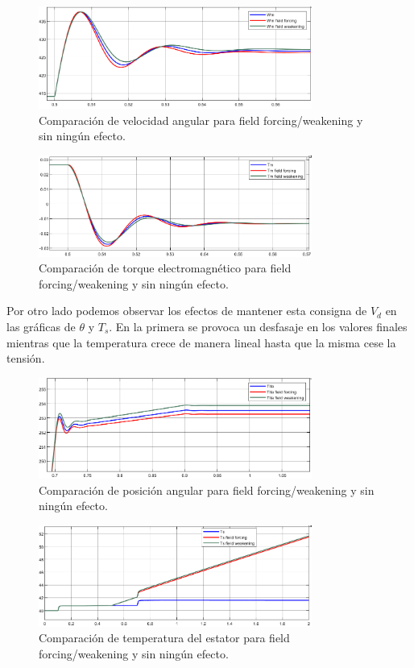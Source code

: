 \documentclass{article}
\begin{document}
\begin{figure}[H]
    \centering
    \includegraphics[width=0.8\textwidth]{5.1.6_d4.png}
    \caption{Comparación de velocidad angular para field forcing/weakening y sin ningún efecto.}
\end{figure}

\begin{figure}[H]
    \centering
    \includegraphics[width=0.8\textwidth]{5.1.6_d5.png}
    \caption{Comparación de torque electromagnético para field forcing/weakening y sin ningún efecto.}
\end{figure}

Por otro lado podemos observar los efectos de mantener esta consigna de $V_d$ en las gráficas de 
$\theta$ y $T_s$. En la primera se provoca un desfasaje en los valores finales mientras que la 
temperatura crece de manera lineal hasta que la misma cese la tensión.

\begin{figure}[H]
    \centering
    \includegraphics[width=0.8\textwidth]{5.1.6_d6.png}
    \caption{Comparación de posición angular para field forcing/weakening y sin ningún efecto.}
\end{figure}

\begin{figure}[H]
    \centering
    \includegraphics[width=0.8\textwidth]{5.1.6_d7.png}
    \caption{Comparación de temperatura del estator para field forcing/weakening y sin ningún efecto.}
\end{figure}
\end{document}
